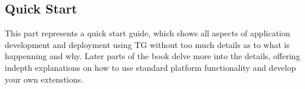 \begin{partbacktext}
\part{Quick Start}\label{part-I}
  This part represents a quick start guide, which shows all aspects of application development and deployment using TG without too much details as to what is happenning and why.
  Later parts of the book delve more into the details, offering indepth explanations on how to use standard platform functionality and develop your own extenstions.
\end{partbacktext}
